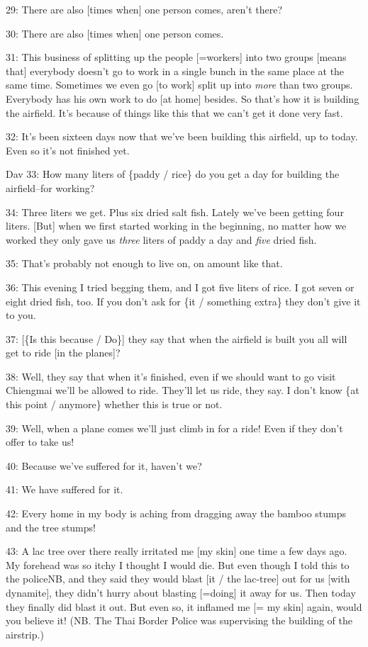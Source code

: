 29: There are also [times when] one person comes, aren't there?

30: There are also [times when] one person comes.

31: This business of splitting up the people [=workers] into two groups [means
that] everybody doesn't go to work in a single bunch in the same place at the same
time. Sometimes we even go [to work] split up into \textit{more} than two groups.
Everybody has his own work to do [at home] besides. So that's how it is building
the airfield. It's because of things like this that we can't get it done very fast.


32: It's been sixteen days now that we've been building this airfield, up to today.
Even so it's not finished yet.

Dav 33: How many liters of \{paddy / rice\} do you get a day for building the airfield--for
working?

34: Three liters we get. Plus six dried salt fish. Lately we've been getting four
liters. [But] when we first started working in the beginning, no matter how we
worked they only gave us \textit{three} liters of paddy a day and \textit{five}
dried fish.

35: That's probably not enough to live on, on amount like that.

36: This evening I tried begging them, and I got five liters of rice. I got seven
or eight dried fish, too. If you don't ask for \{it / something extra\} they don't
give it to you.

37: [\{Is this because / Do\}] they say that when the airfield is built you all
will get to ride [in the planes]?

38: Well, they say that when it's finished, even if we should want to go visit
Chiengmai we'll be allowed to ride. They'll let us ride, they say. I don't know
\{at this point / anymore\} whether this is true or not.

39: Well, when a plane comes we'll just climb in for a ride! Even if they don't
offer to take us!

40: Because we've suffered for it, haven't we?

41: We have suffered for it.

42: Every home in my body is aching from dragging away the bamboo stumps and the
tree stumps!

43: A lac tree over there really irritated me [my skin] one time a few days ago.
My forehead was so itchy I thought I would die. But even though I told this to
the policeNB, and they said they would blast [it / the lac-tree] out for us [with
dynamite], they didn't hurry about blasting [=doing] it away for us. Then today
they finally did blast it out. But even so, it inflamed me [= my skin] again, would
you believe it! (NB. The Thai Border Police was supervising the building of the
airstrip.)

